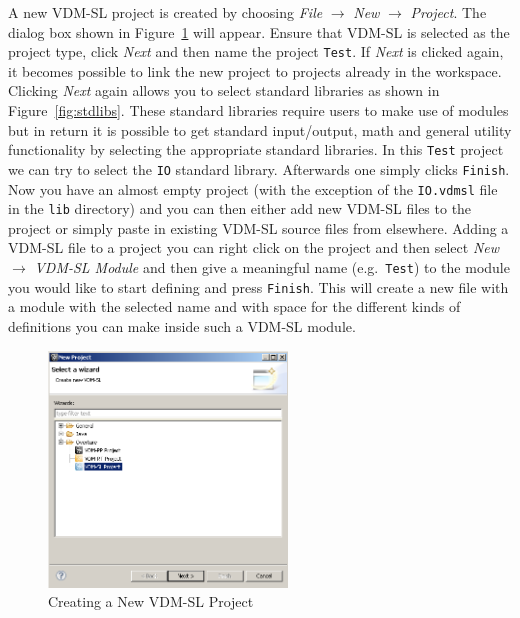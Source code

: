 A new VDM-SL project is created by choosing \emph{File} $ \rightarrow$ \emph{New} $\rightarrow$ \emph{Project}. The dialog box shown in Figure~\ref{fig:newOvertureProjectSL} will appear. Ensure that VDM-SL is selected as the project type, click \emph{Next} and then name the project \texttt{Test}.  If \emph{Next} is clicked again, it becomes possible to link the new project to projects already in the workspace.  Clicking \emph{Next} again allows you to select standard libraries as shown in Figure~\ref{fig:stdlibs}. These standard libraries require users to make use of modules but in return it is possible to get standard input/output, math and general utility functionality by selecting the appropriate standard libraries. In this \texttt{Test} project we can try to select the \texttt{IO} standard library. Afterwards one simply clicks \texttt{Finish}. Now you have an almost empty project (with the exception of the \texttt{IO.vdmsl} file in the \texttt{lib} directory) and you can then
either add new VDM-SL files to the project or simply paste in existing VDM-SL source files from elsewhere. Adding a VDM-SL file to a project you can right click on the project and then select \emph{New} $\rightarrow$ \emph{VDM-SL Module} and then give a meaningful name (e.g.\ \texttt{Test}) to
the module you would like to start defining and press \texttt{Finish}. This will create a new file with a module with the selected name and with space for the different kinds of definitions you can make inside such a VDM-SL module.
%
\begin{figure}[!htb]
\begin{center}
  \includegraphics[width=2.5in]{figures/newovertureSLproject}
  \caption[labelInTOC]{Creating a New VDM-SL Project}
  \label{fig:newOvertureProjectSL}
\end{center}
\end{figure}


